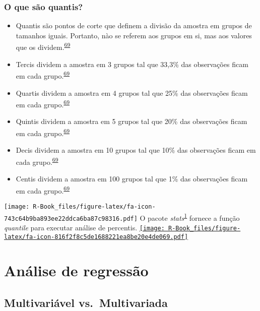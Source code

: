\documentclass[
]{book}
\begin{document}
\hypertarget{o-que-suxe3o-quantis}{%
\subsection{O que são quantis?}\label{o-que-suxe3o-quantis}}

\begin{itemize}
\item
  Quantis são pontos de corte que definem a divisão da amostra em grupos de tamanhos iguais. Portanto, nào se referem aos grupos em si, mas aos valores que os dividem.\textsuperscript{\protect\hyperlink{ref-Altman1994}{69}}
\item
  Tercis dividem a amostra em 3 grupos tal que 33,3\% das observações ficam em cada grupo.\textsuperscript{\protect\hyperlink{ref-Altman1994}{69}}
\item
  Quartis dividem a amostra em 4 grupos tal que 25\% das observações ficam em cada grupo.\textsuperscript{\protect\hyperlink{ref-Altman1994}{69}}
\item
  Quintis dividem a amostra em 5 grupos tal que 20\% das observações ficam em cada grupo.\textsuperscript{\protect\hyperlink{ref-Altman1994}{69}}
\item
  Decis dividem a amostra em 10 grupos tal que 10\% das observações ficam em cada grupo.\textsuperscript{\protect\hyperlink{ref-Altman1994}{69}}
\item
  Centis dividem a amostra em 100 grupos tal que 1\% das observações ficam em cada grupo.\textsuperscript{\protect\hyperlink{ref-Altman1994}{69}}
\end{itemize}

\texttt{[image: R-Book\_files/figure-latex/fa-icon-743c64b9ba893ee22ddca6ba87c98316.pdf]} O pacote \emph{stats}\textsuperscript{\protect\hyperlink{ref-base}{1}} fornece a função \emph{quantile} para executar análise de percentis. \href{https://stat.ethz.ch/R-manual/R-devel/library/stats/html/quantile.html}{\texttt{[image: R-Book\_files/figure-latex/fa-icon-816f2f8c5de1688221ea8be20e4de069.pdf]}}

\hypertarget{analise-regresaao}{%
\chapter{\texorpdfstring{\textbf{Análise de regressão}}{Análise de regressão}}\label{analise-regresaao}}

\hypertarget{multivariavel-multivariada}{%
\section{Multivariável vs.~Multivariada}\label{multivariavel-multivariada}}
\end{document}
